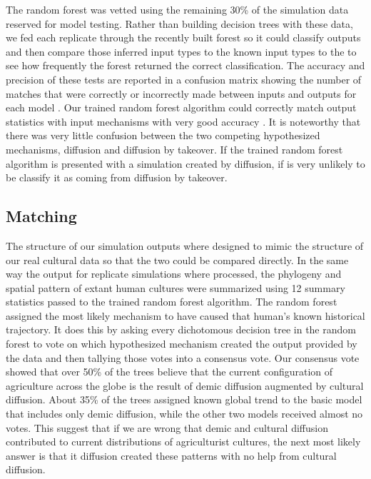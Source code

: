 \documentclass[]{book}
\theoremstyle{definition}
\theoremstyle{definition}
\theoremstyle{definition}
\theoremstyle{remark}
\begin{document}
The random forest was vetted using the remaining 30\% of the simulation
data reserved for model testing. Rather than building decision trees
with these data, we fed each replicate through the recently built forest
so it could classify outputs and then compare those inferred input types
to the known input types to the to see how frequently the forest
returned the correct classification. The accuracy and precision of these
tests are reported in a confusion matrix showing the number of matches
that were correctly or incorrectly made between inputs and outputs for
each model . Our trained random forest algorithm could correctly match
output statistics with input mechanisms with very good accuracy . It is
noteworthy that there was very little confusion between the two
competing hypothesized mechanisms, diffusion and diffusion by takeover.
If the trained random forest algorithm is presented with a simulation
created by diffusion, if is very unlikely to be classify it as coming
from diffusion by takeover.

\subsection{Matching}\label{matching}

The structure of our simulation outputs where designed to mimic the
structure of our real cultural data so that the two could be compared
directly. In the same way the output for replicate simulations where
processed, the phylogeny and spatial pattern of extant human cultures
were summarized using 12 summary statistics passed to the trained random
forest algorithm. The random forest assigned the most likely mechanism
to have caused that human's known historical trajectory. It does this by
asking every dichotomous decision tree in the random forest to vote on
which hypothesized mechanism created the output provided by the data and
then tallying those votes into a consensus vote. Our consensus vote
showed that over 50\% of the trees believe that the current
configuration of agriculture across the globe is the result of demic
diffusion augmented by cultural diffusion. About 35\% of the trees
assigned known global trend to the basic model that includes only demic
diffusion, while the other two models received almost no votes. This
suggest that if we are wrong that demic and cultural diffusion
contributed to current distributions of agriculturist cultures, the next
most likely answer is that it diffusion created these patterns with no
help from cultural diffusion.
\end{document}
